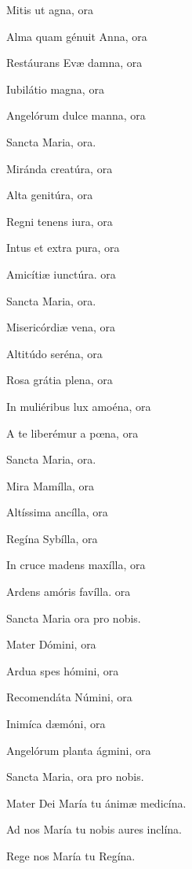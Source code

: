 \documentclass[12pt,a6paper]{book}
\begin{document}
\begin{sloppy}
Mitis ut agna, ora

Alma quam génuit Anna, ora

Restáurans Evæ damna, ora

Iubilátio magna, ora

Angelórum dulce manna, ora

Sancta Maria, ora.

\vspace{3mm}

Miránda creatúra, ora

Alta genitúra, ora

Regni tenens iura, ora

Intus et extra pura, ora

Amicítiæ iunctúra. ora

Sancta Maria, ora.

\vspace{3mm}

Misericórdiæ vena,  ora

Altitúdo seréna, ora

Rosa grátia plena, ora

In muliéribus lux amoéna, ora

A te liberémur a pœna, ora

Sancta Maria, ora.

\vspace{3mm}

Mira Mamílla, ora

Altíssima ancílla, ora

Regína Sybílla, ora

In cruce madens maxílla, ora

Ardens amóris favílla. ora

Sancta Maria ora pro nobis.

\vspace{3mm}

Mater Dómini, ora

Ardua spes hómini, ora

Recomendáta Númini, ora

Inimíca dæmóni, ora

Angelórum planta ágmini, ora

Sancta Maria, ora pro nobis.

\vspace{3mm}

Mater Dei María tu ánimæ medicína.

Ad nos María tu nobis aures inclína.

Rege nos María tu Regína.


\end{sloppy}
\end{document}
